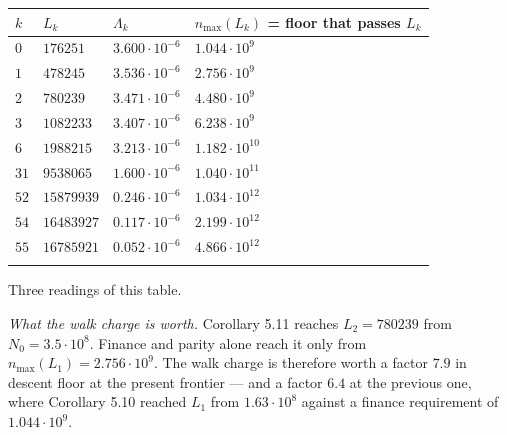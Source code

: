 \documentclass[12pt]{article}
\begin{document}
\begin{longtable}[]{@{}
  >{\raggedright\arraybackslash}p{}
  >{\raggedright\arraybackslash}p{}
  >{\raggedright\arraybackslash}p{}
  >{\raggedright\arraybackslash}p{}@{}}
\toprule\noalign{}
\begin{minipage}[b]{\linewidth}\raggedright
\(k\)
\end{minipage} & \begin{minipage}[b]{\linewidth}\raggedright
\(L_k\)
\end{minipage} & \begin{minipage}[b]{\linewidth}\raggedright
\(\Lambda_k\)
\end{minipage} & \begin{minipage}[b]{\linewidth}\raggedright
\(n_{\max}(L_k)\) = floor that passes \(L_k\)
\end{minipage} \\
\midrule\noalign{}
\endhead
\bottomrule\noalign{}
\endfoot
\bottomrule\noalign{}
\endlastfoot
\(0\) & \(176251\) & \(3.600\cdot10^{-6}\) & \(1.044\cdot10^{9}\) \\
\(1\) & \(478245\) & \(3.536\cdot10^{-6}\) & \(2.756\cdot10^{9}\) \\
\(2\) & \(780239\) & \(3.471\cdot10^{-6}\) & \(4.480\cdot10^{9}\) \\
\(3\) & \(1082233\) & \(3.407\cdot10^{-6}\) & \(6.238\cdot10^{9}\) \\
\(6\) & \(1988215\) & \(3.213\cdot10^{-6}\) & \(1.182\cdot10^{10}\) \\
\(31\) & \(9538065\) & \(1.600\cdot10^{-6}\) & \(1.040\cdot10^{11}\) \\
\(52\) & \(15879939\) & \(0.246\cdot10^{-6}\) & \(1.034\cdot10^{12}\) \\
\(54\) & \(16483927\) & \(0.117\cdot10^{-6}\) & \(2.199\cdot10^{12}\) \\
\(55\) & \(16785921\) & \(0.052\cdot10^{-6}\) & \(4.866\cdot10^{12}\) \\*
\end{longtable}

\endgroup

Three readings of this table.

\emph{What the walk charge is worth.} Corollary 5.11 reaches
\(L_2=780239\) from \(N_0=3.5\cdot10^{8}\). Finance and parity alone
reach it only from \(n_{\max}(L_1)=2.756\cdot10^{9}\). The walk charge
is therefore worth a factor \(7.9\) in descent floor at the present
frontier --- and a factor \(6.4\) at the previous one, where Corollary
5.10 reached \(L_1\) from \(1.63\cdot10^{8}\) against a finance
requirement of \(1.044\cdot10^{9}\).
\end{document}
